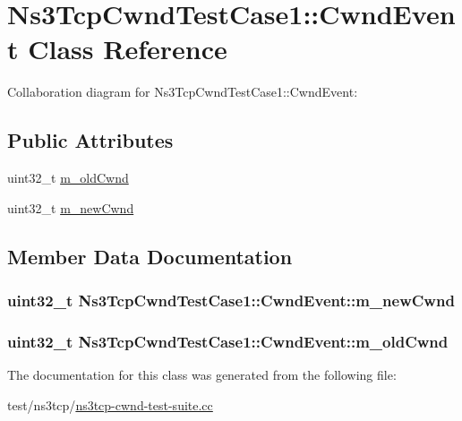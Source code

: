 \hypertarget{classNs3TcpCwndTestCase1_1_1CwndEvent}{}\section{Ns3\+Tcp\+Cwnd\+Test\+Case1\+:\+:Cwnd\+Event Class Reference}
\label{classNs3TcpCwndTestCase1_1_1CwndEvent}


Collaboration diagram for Ns3\+Tcp\+Cwnd\+Test\+Case1\+:\+:Cwnd\+Event\+:
\subsection*{Public Attributes}
\begin{DoxyCompactItemize}
\item 
uint32\+\_\+t \hyperlink{classNs3TcpCwndTestCase1_1_1CwndEvent_ac0cfddf41758c2c3cd7589251359dd1b}{m\+\_\+old\+Cwnd}
\item 
uint32\+\_\+t \hyperlink{classNs3TcpCwndTestCase1_1_1CwndEvent_a7bd6cf8c3729ce1cef31cb50d8cc02e7}{m\+\_\+new\+Cwnd}
\end{DoxyCompactItemize}


\subsection{Member Data Documentation}
\subsubsection[{\texorpdfstring{m\+\_\+new\+Cwnd}{m_newCwnd}}]{\setlength{\rightskip}{0pt plus 5cm}uint32\+\_\+t Ns3\+Tcp\+Cwnd\+Test\+Case1\+::\+Cwnd\+Event\+::m\+\_\+new\+Cwnd}\hypertarget{classNs3TcpCwndTestCase1_1_1CwndEvent_a7bd6cf8c3729ce1cef31cb50d8cc02e7}{}\label{classNs3TcpCwndTestCase1_1_1CwndEvent_a7bd6cf8c3729ce1cef31cb50d8cc02e7}
\subsubsection[{\texorpdfstring{m\+\_\+old\+Cwnd}{m_oldCwnd}}]{\setlength{\rightskip}{0pt plus 5cm}uint32\+\_\+t Ns3\+Tcp\+Cwnd\+Test\+Case1\+::\+Cwnd\+Event\+::m\+\_\+old\+Cwnd}\hypertarget{classNs3TcpCwndTestCase1_1_1CwndEvent_ac0cfddf41758c2c3cd7589251359dd1b}{}\label{classNs3TcpCwndTestCase1_1_1CwndEvent_ac0cfddf41758c2c3cd7589251359dd1b}


The documentation for this class was generated from the following file\+:\begin{DoxyCompactItemize}
\item 
test/ns3tcp/\hyperlink{ns3tcp-cwnd-test-suite_8cc}{ns3tcp-\/cwnd-\/test-\/suite.\+cc}\end{DoxyCompactItemize}
